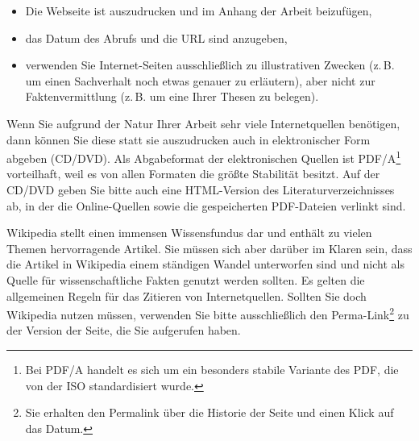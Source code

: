 \begin{itemize}
\item Die Webseite ist auszudrucken und im Anhang der Arbeit beizufügen,
\item das Datum des Abrufs und die URL sind anzugeben,
\item verwenden Sie Internet-Seiten ausschließlich zu illustrativen Zwecken (z.\,B. um einen Sachverhalt noch etwas genauer zu erläutern), aber nicht zur Faktenvermittlung (z.\,B. um eine Ihrer Thesen zu belegen).
\end{itemize}

Wenn Sie aufgrund der Natur Ihrer Arbeit sehr viele Internetquellen benötigen, dann können Sie diese statt sie auszudrucken auch in elektronischer Form abgeben (CD/DVD). Als Abgabeformat der elektronischen Quellen ist PDF/A\footnote{Bei PDF/A handelt es sich um ein besonders stabile Variante des \ac{PDF}, die von der  \ac{ISO} standardisiert wurde.} vorteilhaft, weil es von allen Formaten die größte Stabilität besitzt.
Auf der CD/DVD geben Sie bitte auch eine HTML-Version des Literaturverzeichnisses ab, in der die Online-Quellen sowie die gespeicherten PDF-Dateien verlinkt sind.

Wikipedia stellt einen immensen Wissensfundus dar und enthält zu vielen Themen hervorragende Artikel. Sie müssen sich aber darüber im Klaren sein, dass die Artikel in Wikipedia einem ständigen Wandel unterworfen sind und nicht als Quelle für wissenschaftliche Fakten genutzt werden sollten. Es gelten die allgemeinen Regeln für das Zitieren von Internetquellen. Sollten Sie doch Wikipedia nutzen müssen, verwenden Sie bitte ausschließlich den Perma-Link\footnote{Sie erhalten den Permalink über die Historie der Seite und einen Klick auf das Datum.} zu der Version der Seite, die Sie aufgerufen haben.
